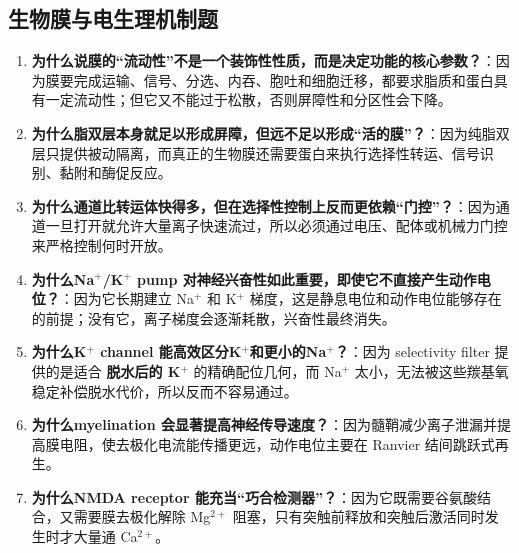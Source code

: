 \documentclass[12pt,fontset=none]{ctexart}
\begin{document}
\subsection*{生物膜与电生理机制题}
\begin{enumerate}
\item \textbf{为什么说膜的“流动性”不是一个装饰性性质，而是决定功能的核心参数？}：因为膜要完成运输、信号、分选、内吞、胞吐和细胞迁移，都要求脂质和蛋白具有一定流动性；但它又不能过于松散，否则屏障性和分区性会下降。

\item \textbf{为什么脂双层本身就足以形成屏障，但远不足以形成“活的膜”？}：因为纯脂双层只提供被动隔离，而真正的生物膜还需要蛋白来执行选择性转运、信号识别、黏附和酶促反应。

\item \textbf{为什么通道比转运体快得多，但在选择性控制上反而更依赖“门控”？}：因为通道一旦打开就允许大量离子快速流过，所以必须通过电压、配体或机械力门控来严格控制何时开放。

\item \textbf{为什么Na$^+$/K$^+$ pump 对神经兴奋性如此重要，即使它不直接产生动作电位？}：因为它长期建立 Na$^+$ 和 K$^+$ 梯度，这是静息电位和动作电位能够存在的前提；没有它，离子梯度会逐渐耗散，兴奋性最终消失。

\item \textbf{为什么K$^+$ channel 能高效区分K$^+$和更小的Na$^+$？}：因为 selectivity filter 提供的是适合 \textbf{脱水后的 K$^+$} 的精确配位几何，而 Na$^+$ 太小，无法被这些羰基氧稳定补偿脱水代价，所以反而不容易通过。

\item \textbf{为什么myelination 会显著提高神经传导速度？}：因为髓鞘减少离子泄漏并提高膜电阻，使去极化电流能传播更远，动作电位主要在 Ranvier 结间跳跃式再生。

\item \textbf{为什么NMDA receptor 能充当“巧合检测器”？}：因为它既需要谷氨酸结合，又需要膜去极化解除 Mg$^{2+}$ 阻塞，只有突触前释放和突触后激活同时发生时才大量通 Ca$^{2+}$。
\end{enumerate}

\end{document}
